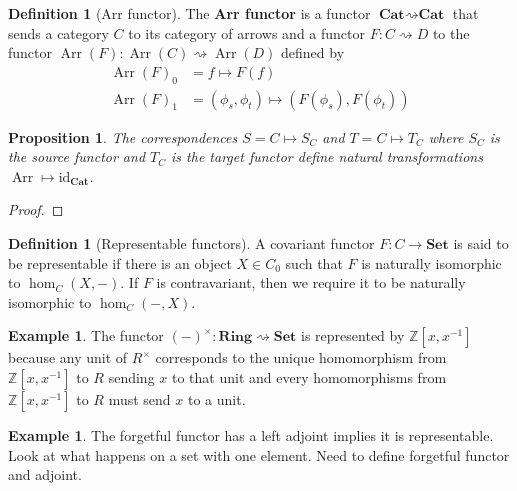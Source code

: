 \documentclass{scrartcl}
\newtheorem{prop}[thm]{Proposition}
\theoremstyle{definition}
\newtheorem{defn}[thm]{Definition}
\newtheorem{exmp}[thm]{Example}
\theoremstyle{remark}
\newcommand{\Z}{\mathbb{Z}}
\DeclareMathOperator{\arr}{Arr}
\newcommand{\id}{\text{id}}
\begin{document}
\begin{defn}[Arr functor]
    The \textbf{Arr functor} is a functor $\textbf{Cat}\rightsquigarrow \textbf{Cat}$ that sends a category $C$ to its category of arrows and a functor $F:C \rightsquigarrow D$ to the functor $\arr(F): \arr(C) \rightsquigarrow \arr(D)$ defined by
    \begin{align*}
        \arr(F)_0 &= f \mapsto F(f)\\
        \arr(F)_1 &= (\phi_s,\phi_t) \mapsto (F(\phi_s),F(\phi_t))
    \end{align*}
\end{defn}
\begin{prop}
    The correspondences $S = C\mapsto S_C$ and $T = C\mapsto T_C$ where $S_C$ is the source functor and $T_C$ is the target functor define natural transformations $\arr \mapsto \id_{\textbf{Cat}}$.
\end{prop}
\begin{proof}
\end{proof}

\begin{defn}[Representable functors]
    A covariant functor $F: C\rightarrow \textbf{Set}$ is said to be representable if there is an object $X \in C_0$ such that $F$ is naturally isomorphic to $\hom_C(X,-)$. If $F$ is contravariant, then we require it to be naturally isomorphic to $\hom_C(-,X)$.
\end{defn}
\begin{exmp}
    The functor $(-)^{\times}: \textbf{Ring} \rightsquigarrow \textbf{Set}$ is represented by $\Z[x,x^{-1}]$ because any unit of $R^{\times}$ corresponds to the unique homomorphism from $\Z[x,x^{-1}]$ to $R$ sending $x$ to that unit and every homomorphisms from $\Z[x,x^{-1}]$ to $R$ must send $x$ to a unit.
\end{exmp}
\begin{exmp}
    The forgetful functor has a left adjoint implies it is representable. Look at what happens on a set with one element. Need to define forgetful functor and adjoint. %
\end{exmp}
\end{document}
